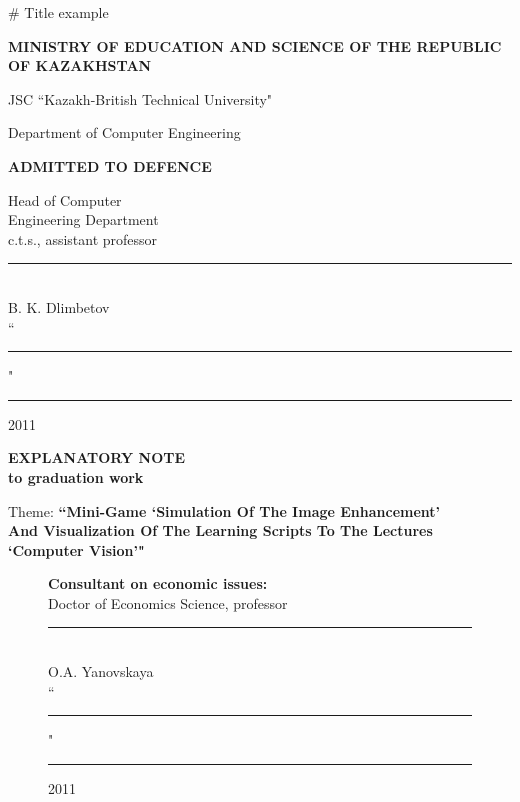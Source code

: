 # Title example
\begin{titlepage}
	\pagestyle{empty}
	\begin{center}
		{\bf{\MakeUppercase{Ministry of education and science of the republic of Kazakhstan}}

		\vspace{12pt}

		JSC ``Kazakh-British Technical University"


		Department of Computer Engineering}

		\begin{flushright}
			{\bf \MakeUppercase{Admitted to defence}}

			Head of Computer\\
			Engineering Department\\
			c.t.s., assistant professor\\
			\vspace{0.5\baselineskip}
			\rule{13em}{0.4pt}\\
			B. K. Dlimbetov\\
			\vspace{0.5\baselineskip}
			``\rule{2em}{0.4pt}" \rule{8em}{0.4pt} 2011\\
		\end{flushright}

		{\bf
		\MakeUppercase{Explanatory Note}\\
		to graduation work}

		\vspace{12pt}

		Theme: {\bf ``Mini-Game `Simulation Of The Image Enhancement' \\
		And Visualization Of The Learning Scripts To The Lectures \\
		`Computer Vision'"}

	\end{center}

	\begin{figure}[ht]
		\begin{minipage}[t]{0.5\linewidth}
			\begin{flushleft}
				{\bf Consultant on economic issues:}\\
				Doctor of Economics Science, professor\\
				\vspace{0.5\baselineskip}
				\rule{13em}{0.4pt}\\
				O.A. Yanovskaya\\
				\vspace{0.5\baselineskip}
				``\rule{2em}{0.4pt}" \rule{8em}{0.4pt} 2011\\
				\vspace{1\baselineskip}
				

\end{flushleft}
\end{minipage}
\end{figure}
\end{titlepage}
